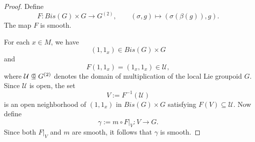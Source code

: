 \documentclass[10pt,a4paper]{amsart}
\newcommand\opn{\mathrel{\ooalign{$\subseteq$\cr
  \hidewidth\raise.225ex\hbox{$\circ\mkern.5mu$}\cr}}}
\begin{document}
\begin{proof}
Define
\[
F:Bis(G)\times G\to G^{(2)},
\qquad
(\sigma,g)\mapsto (\sigma(\beta(g)),g).
\]
The map $F$ is smooth.

For each $x\in M$, we have
\[
(1,1_x)\in Bis(G)\times G
\]
and
\[
F(1,1_x)=(1_x,1_x)\in \mathcal U,
\]
where $\mathcal U\opn G^{(2)}$ denotes the domain of multiplication of the local Lie groupoid $G$. Since $\mathcal U$ is open, the set
\[
V:=F^{-1}(\mathcal U)
\]
is an open neighborhood of $(1,1_x)$ in $Bis(G)\times G$ satisfying
$F(V)\subseteq \mathcal U$.
Now define
\[
\gamma:=m\circ F|_V:V\to G.
\]
Since both $F|_V$ and $m$ are smooth, it follows that $\gamma$ is smooth.
\end{proof}
\end{document}
